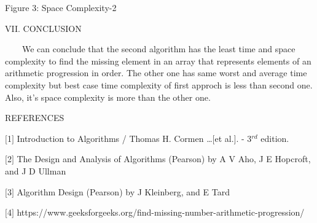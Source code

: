 \documentclass[12pt,a4paper]{article}
\begin{document}
\begin{multicols}{2}
\begin{center}Figure 3: Space Complexity-2\end{center}



\begin{center}VII. CONCLUSION\end{center}

\ \ \ \ We can conclude that the second algorithm has the least time and space 
complexity to find the missing element in an array that represents elements of an arithmetic progression in order. 
The other one has same worst and average time complexity but best case time complexity of first approch is less than second one. Also,  it's space complexity is more than the other one.


\begin{center}REFERENCES\end{center}

$[$1$]$ Introduction to Algorithms / Thomas H. Cormen \ldots $[$et 
al.$]$. - 3$^{rd}$ edition.

$[$2$]$ The Design and Analysis of Algorithms (Pearson) by A V Aho, J E 
Hopcroft, and J D Ullman 

$[$3$]$ Algorithm Design (Pearson) by J Kleinberg, and E Tard

$[$4$]$ https://www.geeksforgeeks.org/find-missing-number-arithmetic-progression/

\end{multicols}
\end{document}
